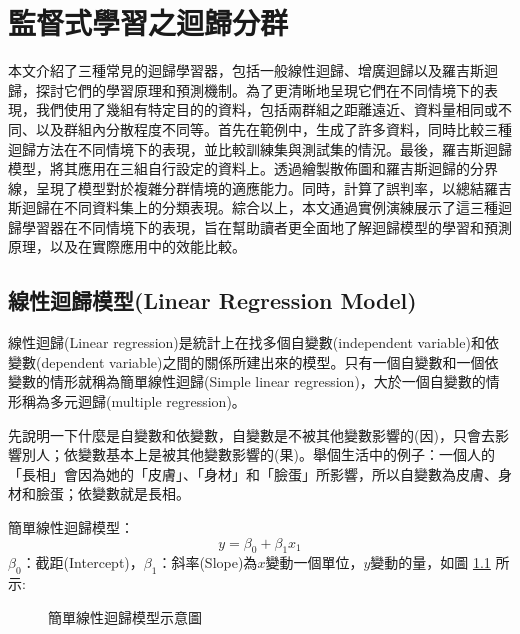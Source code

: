 \chapter{監督式學習之迴歸分群}
本文介紹了三種常見的迴歸學習器，包括一般線性迴歸、增廣迴歸以及羅吉斯迴歸，探討它們的學習原理和預測機制。為了更清晰地呈現它們在不同情境下的表現，我們使用了幾組有特定目的的資料，包括兩群組之距離遠近、資料量相同或不同、以及群組內分散程度不同等。首先在範例中，生成了許多資料，同時比較三種迴歸方法在不同情境下的表現，並比較訓練集與測試集的情況。最後，羅吉斯迴歸模型，將其應用在三組自行設定的資料上。透過繪製散佈圖和羅吉斯迴歸的分界線，呈現了模型對於複雜分群情境的適應能力。同時，計算了誤判率，以總結羅吉斯迴歸在不同資料集上的分類表現。綜合以上，本文通過實例演練展示了這三種迴歸學習器在不同情境下的表現，旨在幫助讀者更全面地了解迴歸模型的學習和預測原理，以及在實際應用中的效能比較。

\section{線性迴歸模型(Linear Regression Model)}
線性迴歸(Linear regression)是統計上在找多個自變數(independent variable)和依變數(dependent variable)之間的關係所建出來的模型。只有一個自變數和一個依變數的情形就稱為簡單線性迴歸(Simple linear regression)，大於一個自變數的情形稱為多元迴歸(multiple regression)。

先說明一下什麼是自變數和依變數，自變數是不被其他變數影響的(因)，只會去影響別人；依變數基本上是被其他變數影響的(果)。舉個生活中的例子：一個人的「長相」會因為她的「皮膚」、「身材」和「臉蛋」所影響，所以自變數為皮膚、身材和臉蛋；依變數就是長相。

簡單線性迴歸模型：$$y=\beta_0+\beta_1 x_1$$
$\beta_0$：截距(Intercept)，$\beta_1$：斜率(Slope)為$x$變動一個單位，$y$變動的量，如圖 \ref{fig:simplelinearregression} 所示:
\begin{figure}[h]
    \caption{簡單線性迴歸模型示意圖}
    \label{fig:simplelinearregression}
\end{figure}

